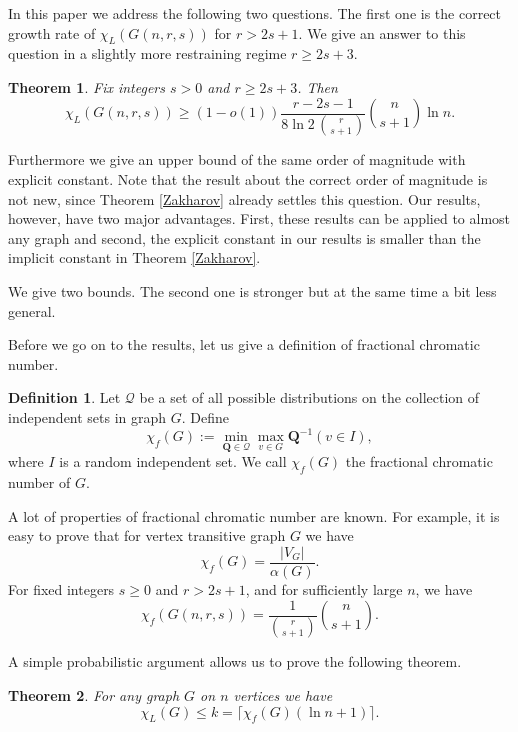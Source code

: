 \documentclass[10pt,a4paper]{article}
\newtheorem{theorem}{Theorem}
\theoremstyle{remark}
\theoremstyle{definition}
\newtheorem{definition}{Definition}[section]
\begin{document}
In this paper we address the following two questions. The first one is the correct growth rate of $\chi_L(G(n,r,s))$ for $r > 2s+1$. We give an answer to this question in a slightly more restraining regime $r \geq 2s+3$. 

\begin{theorem}
    \label{main_gnrs}
    Fix integers $s > 0$ and $r \geq 2s+3$. Then
    $$
        \chi_L(G(n,r,s)) \geq (1-o(1))\frac{r-2s-1}{8\ln 2\, \binom{r}{s+1}}\binom{n}{s+1}\ln n.
    $$
\end{theorem}

Furthermore we give an upper bound of the same order of magnitude with explicit constant. Note that the result about the correct order of magnitude is not new, since Theorem \ref{Zakharov} already settles this question. Our results, however, have two major advantages. First, these results can be applied to almost any graph and second, the explicit constant in our results is smaller than the implicit constant in Theorem \ref{Zakharov}.

We give two bounds. The second one is stronger but at the same time a bit less general.

Before we go on to the results, let us give a definition of fractional chromatic number.

\begin{definition}
    Let $\mathcal{Q}$ be a set of all possible distributions on the collection of independent sets in graph $G$. Define 
    $$
        \chi_f(G) := \min_{\mathbf{Q} \in \mathcal{Q}} \max_{v \in G} \mathbf{Q}^{-1}(v \in I),
    $$
    where $I$ is a random independent set. We call $\chi_f(G)$ the fractional chromatic number of $G$.
\end{definition}

A lot of properties of fractional chromatic number are known. For example, it is easy to prove that for vertex transitive graph $G$ we have
$$
    \chi_f(G) = \frac{|V_G|}{\alpha(G)}.
$$
For fixed integers $s \geq 0$ and $r > 2s+1$, and for sufficiently large $n$, we have 
$$
\chi_f(G(n,r,s)) = \frac{1}{\binom{r}{s+1}}\binom{n}{s+1}.
$$

A simple probabilistic argument allows us to prove the following theorem.

\begin{theorem}
    \label{UB1}
    For any graph $G$ on $n$ vertices we have 
    $$
        \chi_L(G) \leq k = \lceil\chi_f(G)(\ln n + 1)\rceil.
    $$
\end{theorem}
\end{document}
